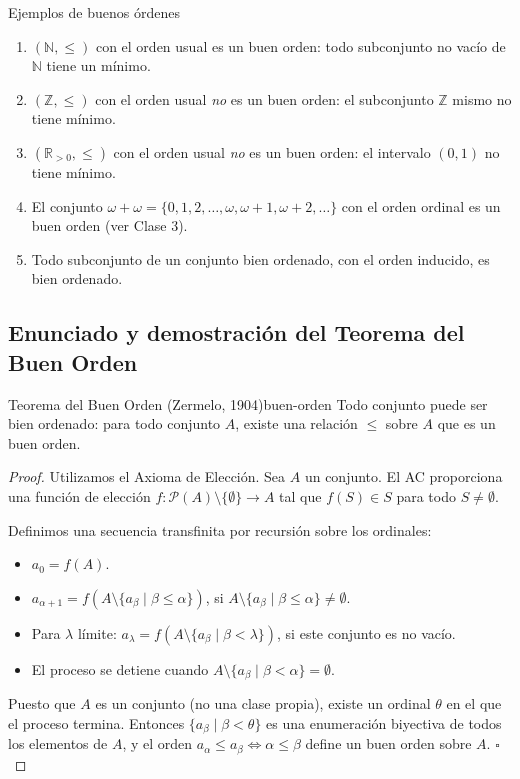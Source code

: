 \begin{ejemplo}{Ejemplos de buenos órdenes}{}
\begin{enumerate}[leftmargin=2em, label=(\alph*)]
  \item $(\mathbb{N}, \leq)$ con el orden usual es un buen orden: todo subconjunto no vacío de $\mathbb{N}$ tiene un mínimo.

  \item $(\mathbb{Z}, \leq)$ con el orden usual \emph{no} es un buen orden: el subconjunto $\mathbb{Z}$ mismo no tiene mínimo.

  \item $(\mathbb{R}_{>0}, \leq)$ con el orden usual \emph{no} es un buen orden: el intervalo $(0, 1)$ no tiene mínimo.

  \item El conjunto $\omega + \omega = \{0, 1, 2, \ldots, \omega, \omega+1, \omega+2, \ldots\}$ con el orden ordinal es un buen orden (ver Clase 3).

  \item Todo subconjunto de un conjunto bien ordenado, con el orden inducido, es bien ordenado.
\end{enumerate}
\end{ejemplo}

\subsection{Enunciado y demostración del Teorema del Buen Orden}

\begin{teorema}{Teorema del Buen Orden (Zermelo, 1904)}{buen-orden}
Todo conjunto puede ser bien ordenado: para todo conjunto $A$, existe una relación $\leq$ sobre $A$ que es un buen orden.
\end{teorema}

\begin{proof}
Utilizamos el Axioma de Elección. Sea $A$ un conjunto. El AC proporciona una función de elección $f: \mathcal{P}(A) \setminus \{\emptyset\} \to A$ tal que $f(S) \in S$ para todo $S \neq \emptyset$.

Definimos una secuencia transfinita por recursión sobre los ordinales:
\begin{itemize}[leftmargin=2em]
  \item $a_0 = f(A)$.
  \item $a_{\alpha+1} = f(A \setminus \{a_\beta \mid \beta \leq \alpha\})$, si $A \setminus \{a_\beta \mid \beta \leq \alpha\} \neq \emptyset$.
  \item Para $\lambda$ límite: $a_\lambda = f(A \setminus \{a_\beta \mid \beta < \lambda\})$, si este conjunto es no vacío.
  \item El proceso se detiene cuando $A \setminus \{a_\beta \mid \beta < \alpha\} = \emptyset$.
\end{itemize}

Puesto que $A$ es un conjunto (no una clase propia), existe un ordinal $\theta$ en el que el proceso termina. Entonces $\{a_\beta \mid \beta < \theta\}$ es una enumeración biyectiva de todos los elementos de $A$, y el orden $a_\alpha \leq a_\beta \iff \alpha \leq \beta$ define un buen orden sobre $A$. $\square$
\end{proof}

